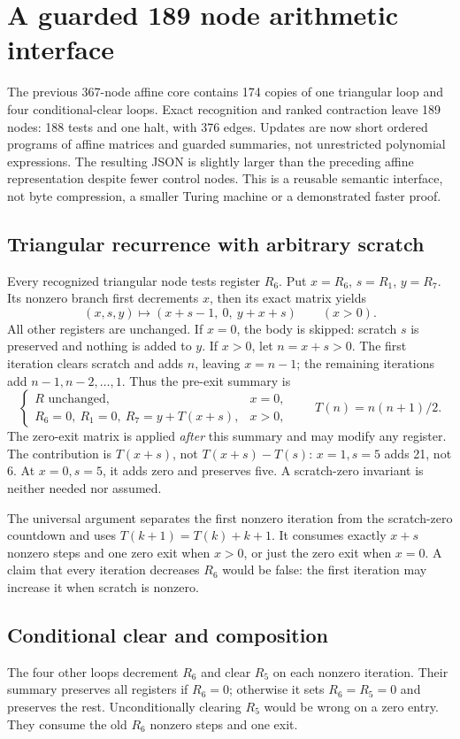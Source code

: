\documentclass[11pt]{article}
\begin{document}
\section{A guarded 189 node arithmetic interface}
The previous 367-node affine core contains 174 copies of one triangular loop and four conditional-clear loops. Exact recognition and ranked contraction leave 189 nodes: 188 tests and one halt, with 376 edges. Updates are now short ordered programs of affine matrices and guarded summaries, not unrestricted polynomial expressions. The resulting JSON is slightly larger than the preceding affine representation despite fewer control nodes. This is a reusable semantic interface, not byte compression, a smaller Turing machine or a demonstrated faster proof.

\subsection{Triangular recurrence with arbitrary scratch}
Every recognized triangular node tests register $R_6$. Put $x=R_6$, $s=R_1$, $y=R_7$. Its nonzero branch first decrements $x$, then its exact matrix yields
\[
 (x,s,y)\longmapsto(x+s-1,\ 0,\ y+x+s)\qquad(x>0).
\]
All other registers are unchanged. If $x=0$, the body is skipped: scratch $s$ is preserved and nothing is added to $y$. If $x>0$, let $n=x+s>0$. The first iteration clears scratch and adds $n$, leaving $x=n-1$; the remaining iterations add $n-1,n-2,\ldots,1$. Thus the pre-exit summary is
\[
 \begin{cases}
 R\text{ unchanged},&x=0,\\
 R_6=0,\ R_1=0,\ R_7=y+T(x+s),&x>0,
 \end{cases}
 \qquad T(n)=n(n+1)/2.
\]
The zero-exit matrix is applied \emph{after} this summary and may modify any register. The contribution is $T(x+s)$, not $T(x+s)-T(s)$: $x=1,s=5$ adds 21, not 6. At $x=0,s=5$, it adds zero and preserves five. A scratch-zero invariant is neither needed nor assumed.

The universal argument separates the first nonzero iteration from the scratch-zero countdown and uses $T(k+1)=T(k)+k+1$. It consumes exactly $x+s$ nonzero steps and one zero exit when $x>0$, or just the zero exit when $x=0$. A claim that every iteration decreases $R_6$ would be false: the first iteration may increase it when scratch is nonzero.

\subsection{Conditional clear and composition}
The four other loops decrement $R_6$ and clear $R_5$ on each nonzero iteration. Their summary preserves all registers if $R_6=0$; otherwise it sets $R_6=R_5=0$ and preserves the rest. Unconditionally clearing $R_5$ would be wrong on a zero entry. They consume the old $R_6$ nonzero steps and one exit.
\end{document}
